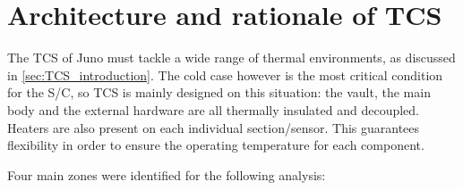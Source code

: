 \section{Architecture and rationale of TCS}
\label{sec:TCS_architecture_rationale}

The TCS of Juno must tackle a wide range of thermal environments, as discussed in \autoref{sec:TCS_introduction}.
The cold case however is the most critical condition for the S/C, so TCS is mainly designed on this situation: the vault, the main body and the external hardware are all thermally insulated and decoupled. Heaters are also present on each individual section/sensor. This guarantees flexibility in order to ensure the operating temperature for each component.


\vspace*{-3mm}

Four main zones were identified for the following analysis:

